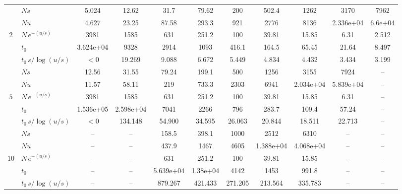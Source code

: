 \documentclass[10pt]{article}
\begin{document}
\begin{table}[t]
\begin{adjustbox}{max width=\textwidth, max totalheight=0.9\textheight, center}
\begin{tabular}{c lccccccccc}
\midrule
 & $Ns$ & 5.024 & 12.62 & 31.7 & 79.62 & 200 & 502.4 & 1262 & 3170 & 7962 \\
 & $Nu$ & 4.627 & 23.25 & 87.58 & 293.3 & 921 & 2776 & 8136 & 2.336e+04 & 6.6e+04 \\
$2$ & $N\,e^{-(u/s)}$ & 3981 & 1585 & 631 & 251.2 & 100 & 39.81 & 15.85 & 6.31 & 2.512 \\
 & $t_0$ & 3.624e+04 & 9328 & 2914 & 1093 & 416.1 & 164.5 & 65.45 & 21.64 & 8.497 \\
 & $t_0\,s/\log(u/s)$ & $<0$ & 19.269 & 9.088 & 6.672 & 5.449 & 4.834 & 4.432 & 3.434 & 3.199 \\
\midrule
 & $Ns$ & 12.56 & 31.55 & 79.24 & 199.1 & 500 & 1256 & 3155 & 7924 & -- \\
 & $Nu$ & 11.57 & 58.11 & 219 & 733.3 & 2303 & 6941 & 2.034e+04 & 5.839e+04 & -- \\
$5$ & $N\,e^{-(u/s)}$ & 3981 & 1585 & 631 & 251.2 & 100 & 39.81 & 15.85 & 6.31 & -- \\
 & $t_0$ & 1.536e+05 & 2.598e+04 & 7041 & 2266 & 796 & 283.7 & 109.4 & 57.24 & -- \\
 & $t_0\,s/\log(u/s)$ & $<0$ & 134.148 & 54.900 & 34.595 & 26.063 & 20.844 & 18.511 & 22.713 & -- \\
\midrule
 & $Ns$ & -- & -- & 158.5 & 398.1 & 1000 & 2512 & 6310 & -- & -- \\
 & $Nu$ & -- & -- & 437.9 & 1467 & 4605 & 1.388e+04 & 4.068e+04 & -- & -- \\
$10$ & $N\,e^{-(u/s)}$ & -- & -- & 631 & 251.2 & 100 & 39.81 & 15.85 & -- & -- \\
 & $t_0$ & -- & -- & 5.639e+04 & 1.38e+04 & 4142 & 1453 & 991.8 & -- & -- \\
 & $t_0\,s/\log(u/s)$ & -- & -- & 879.267 & 421.433 & 271.205 & 213.564 & 335.783 & -- & -- \\
\bottomrule
\end{tabular}
\end{adjustbox}
\end{table}
\end{document}

